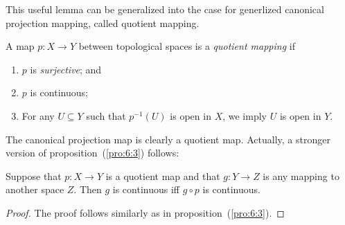 \begin{remark}
This useful lemma can be generalized into the case for generlized canonical projection mapping, called quotient mapping.
\begin{definition}
A map $p:X\to Y$ between topological spaces is a \emph{quotient mapping} if
\begin{enumerate}
\item
$p$ is \emph{surjective}; and
\item
$p$ is continuous;
\item
For any $U\subseteq Y$ such that $p^{-1}(U)$ is open in $X$, we imply
$U$ is open in $Y$.
\end{enumerate}
\end{definition}
The canonical projection map is clearly a quotient map. Actually, a stronger version of proposition~(\ref{pro:6:3}) follows:
\begin{proposition}\label{pro:6:4}
Suppose that $p:X\to Y$ is a quotient map and that $g:Y\to Z$ is any mapping to another space $Z$.
Then $g$ is continuous iff $g\circ p$ is continuous.
\end{proposition}
\begin{proof}
The proof follows similarly as in proposition~(\ref{pro:6:3}).
\end{proof}
\end{remark}

